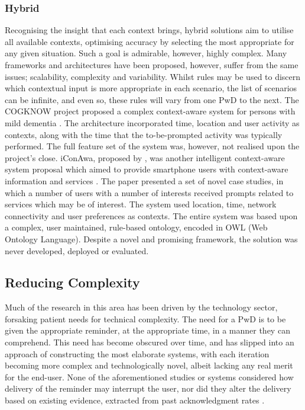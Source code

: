 \subsubsection{Hybrid}
Recognising the insight that each context brings, hybrid solutions aim to utilise all available contexts, optimising accuracy by selecting the most appropriate for any given situation. Such a goal is admirable, however, highly complex. Many frameworks and architectures have been proposed, however, suffer from the same issues; scalability, complexity and variability. Whilst rules may be used to discern which contextual input is more appropriate in each scenario, the list of scenarios can be infinite, and even so, these rules will vary from one PwD to the next. The COGKNOW project  proposed a complex context-aware system for persons with mild dementia \cite{Zhang2008}. The architecture incorporated time, location and user activity as contexts, along with the time that the to-be-prompted activity was typically performed. The full feature set of the system was, however, not realised upon the project’s close. iConAwa, proposed by \citeauthor{Ylmaz2012}, was another intelligent context-aware system proposal which aimed to provide smartphone users with context-aware information and services \cite{Ylmaz2012}. The paper presented a set of novel case studies, in which a number of users with a number of interests received prompts related to services which may be of interest. The system used location, time, network connectivity and user preferences as contexts.  The entire system was based upon a complex, user maintained, rule-based ontology, encoded in OWL (Web Ontology Language). Despite a novel and promising framework, the solution was never developed, deployed or evaluated.

\subsection{Reducing Complexity}
Much of the research in this area has been driven by the technology sector, forsaking patient needs for technical complexity.
The need for a PwD is to be given the appropriate reminder, at the appropriate time, in a manner they can comprehend. This need has become obscured over time, and has slipped into an approach of constructing the most elaborate systems, with each iteration becoming more complex and technologically novel, albeit lacking any real merit for the end-user. None of the aforementioned studies or systems considered how delivery of the reminder may interrupt the user, nor did they alter the delivery based on existing evidence, extracted from past acknowledgment rates \cite{Hartin2014-WAGER}.

